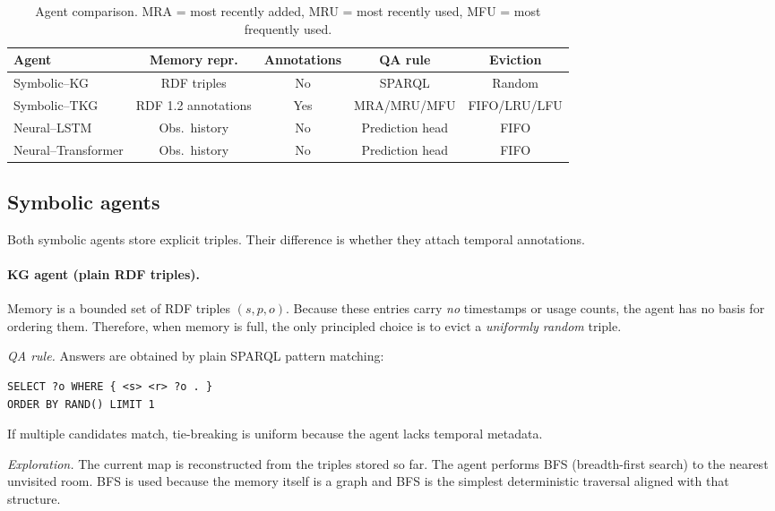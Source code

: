 \documentclass[Afour,sageh,times]{sagej}
\begin{document}
\begin{table}[t]
\centering
\small
\begin{tabular}{lcccc}
\toprule
\textbf{Agent} &
\textbf{Memory repr.} &
\textbf{Annotations} &
\textbf{QA rule} &
\textbf{Eviction} \\
\midrule
Symbolic--KG &
RDF triples &
No &
SPARQL &
Random \\

Symbolic--TKG &
RDF 1.2 annotations &
Yes &
MRA/MRU/MFU &
FIFO/LRU/LFU \\

Neural--LSTM &
Obs.\ history &
No &
Prediction head &
FIFO \\

Neural--Transformer &
Obs.\ history &
No &
Prediction head &
FIFO \\
\bottomrule
\end{tabular}
\caption{Agent comparison. MRA = most recently added, MRU = most recently used,
MFU = most frequently used.}
\label{tab:agents}
\end{table}

\subsection{Symbolic agents}

Both symbolic agents store explicit triples. Their difference is whether
they attach temporal annotations.

\paragraph{KG agent (plain RDF triples).}
Memory is a bounded set of RDF triples $(s,p,o)$. Because these entries carry \emph{no}
timestamps or usage counts, the agent has no basis for ordering them. Therefore, when
memory is full, the only principled choice is to evict a \emph{uniformly random} triple.

\emph{QA rule.} Answers are obtained by plain SPARQL pattern matching:
\begin{lstlisting}[language=SPARQL,basicstyle=\ttfamily\small,frame=single]
SELECT ?o WHERE { <s> <r> ?o . }
ORDER BY RAND() LIMIT 1
\end{lstlisting}
If multiple candidates match, tie-breaking is uniform because the agent
lacks temporal metadata.

\emph{Exploration.}
The current map is reconstructed from the triples stored so far. The agent performs BFS
(breadth-first search) to the nearest unvisited room. BFS is used because the memory
itself is a graph and BFS is the simplest deterministic traversal aligned with that
structure.
\end{document}
